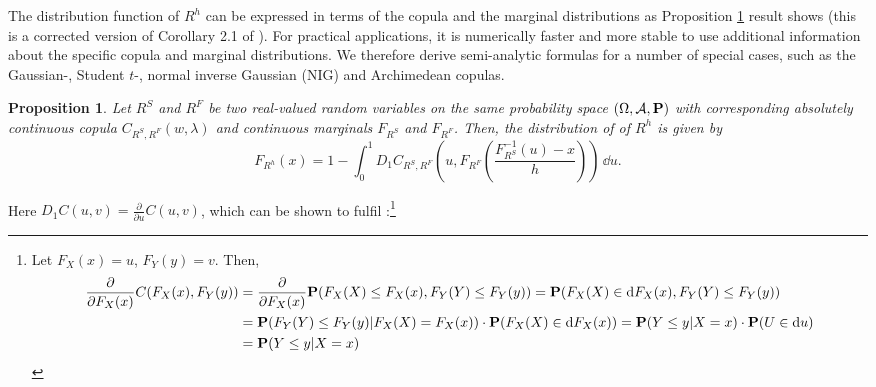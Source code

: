 \documentclass[square]{article} %
\theoremstyle{plain}
\newtheorem{proposition}[theorem]{Proposition}
\theoremstyle{definition} %
\begin{document}
The distribution function of $R^h$ can be expressed in terms of the
copula and the marginal distributions as Proposition \ref{prop:dfrh}
result shows (this is a corrected version of Corollary 2.1 of
\citep{Barbi2014}). For practical applications, it is numerically
faster and more stable to use additional information about the
specific copula and marginal distributions. We therefore derive
semi-analytic formulas for a number of special cases, such as the
Gaussian-, Student $t$-, normal inverse Gaussian (NIG) and Archimedean
copulas.
\begin{proposition}
  \label{prop:dfrh}
  Let $R^S$ and $R^F$ be two real-valued random variables on the same
  probability space $(\Omega, \mathcal A, {\bf P})$ with corresponding
  absolutely continuous copula $C_{R^S, R^F}(w,\lambda)$ and
  continuous marginals $F_{R^S}$ and $F_{R^F}$. Then, the distribution
  of of $R^h$ is given by
  \begin{equation}
    \label{eq:3}
    F_{R^h}(x) = 1- \int^1_0 D_1 C_{R^S, R^F}
    \left( u, F_{R^F} \left( \frac{F^{-1}_{R^S}(u)-x}{h} \right)
    \right)\, \dd u.  
  \end{equation}
\end{proposition}
Here $D_1 C(u,v)=\displaystyle \frac{\partial}{\partial u} C(u,v)$,
which can be shown to fulfil \citep{Cherubini2011}:\footnote{%
  Let $F_X(x)=u$, $F_Y(y)=v$. Then,
  \begin{align*}
    \frac{\partial}{\partial F_X(x)} C(F_X(x), F_Y(y)) %
    &= \frac{\partial}{\partial F_X(x)} \p(F_X(X)\leq F_X(x),
      F_Y(Y)\leq F_Y(y)) %
      = \p(F_X(X)\in \dd F_X(x), F_Y(Y)\leq F_Y(y))\\ %
    &= \p(F_Y(Y)\leq F_Y(y)| F_X(X) = F_X(x))\cdot \p(F_X(X) \in \dd
      F_X(x)) %
      = \p(Y\leq y|X=x)\cdot \p(U\in \dd u)\\ %
    &= \p(Y\leq y|X=x)
  \end{align*}
  }
\end{document}
